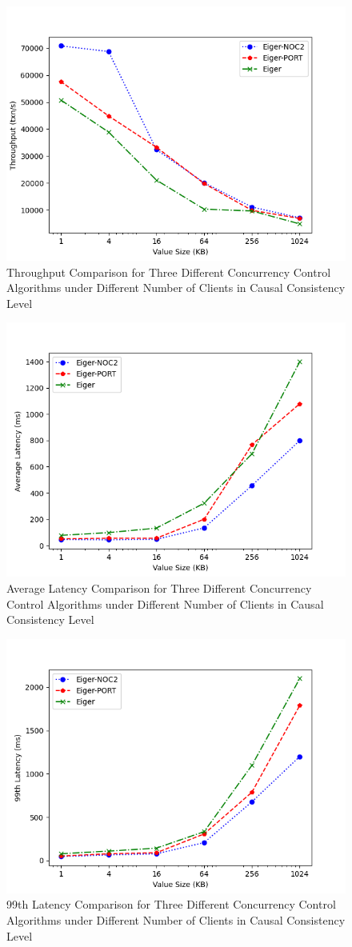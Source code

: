 \begin{figure}[H]
    \centering
    \includegraphics[width=0.8\linewidth]{figure/5-tcc-t.png}
    \caption{Throughput Comparison for Three Different Concurrency Control Algorithms under Different Number of Clients in Causal Consistency Level}
    \label{fig:16}
\end{figure}
\begin{figure}[H]
    \centering
    \includegraphics[width=0.8\linewidth]{figure/5-tcc-al.png}
    \caption{Average Latency Comparison for Three Different Concurrency Control Algorithms under Different Number of Clients in Causal Consistency Level}
    \label{fig:17}
\end{figure}
\begin{figure}[H]
    \centering
    \includegraphics[width=0.8\linewidth]{figure/5-tcc-l.png}
    \caption{99th Latency Comparison for Three Different Concurrency Control Algorithms under Different Number of Clients in Causal Consistency Level}
    \label{fig:18}
\end{figure}

